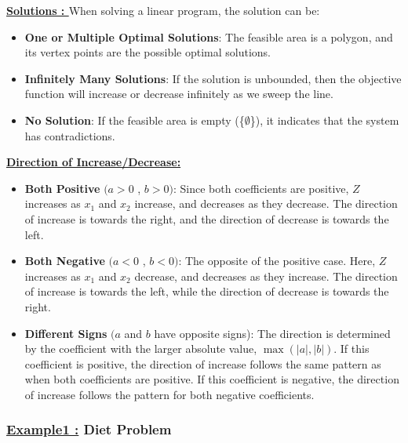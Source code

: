 \begin{tcolorbox}[title=Note]
 \textbf{\underline{Solutions : }}
When solving a linear program, the solution can be:
\begin{itemize}
    \item \textbf{One or Multiple Optimal Solutions}: The feasible area is a polygon, and its vertex points are the possible optimal solutions.
    \item \textbf{Infinitely Many Solutions}: If the solution is unbounded, then the objective function will increase or decrease infinitely as we sweep the line.
    \item \textbf{No Solution}: If the feasible area is empty (\{\(\emptyset\)\}), it indicates that the
system has contradictions.
\end{itemize}


\textbf{\underline{Direction of Increase/Decrease:}}

\begin{itemize}
    \item \textbf{Both Positive} \((a > 0\) , \(b > 0)\): Since both coefficients are positive, \( Z \) increases as
\( x_1 \) and \( x_2 \) increase, and decreases as they decrease. The direction of increase is towards the right,
and the direction of decrease is towards the left.

    \item \textbf{Both Negative} \((a < 0\) , \(b < 0)\): The opposite of the positive case. Here, \( Z \) increases
as \( x_1 \) and \( x_2 \) decrease, and decreases as they increase. The direction of increase is towards the left,
while the direction of decrease is towards the right.

    \item \textbf{Different Signs} \((a\) and \(b\) have opposite signs): The direction is determined by 
the coefficient with the larger absolute value, \(\max(|a|, |b|)\). If this coefficient is positive, the direction 
of increase follows the same pattern as when both coefficients are positive. If this coefficient is negative, 
the direction of increase follows the pattern for both negative coefficients.
\end{itemize}
\end{tcolorbox}



\subsubsection*{{\underline{Example1 :} Diet Problem}}

